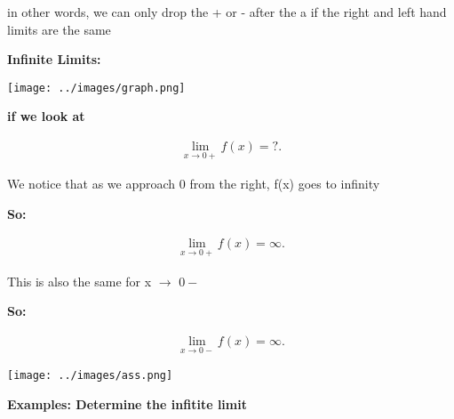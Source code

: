 \documentclass{report}
\begin{document}
    \bigbreak \noindent 
    in other words, we can only drop the + or - after the a if the right and left hand limits are the same

    \pagebreak
    \begin{large}
       \noindent \textbf{Infinite Limits:} 
    \end{large}
    
    \bigbreak \noindent \bigbreak 
    \begin{center}
        \texttt{[image: ../images/graph.png]}
    \end{center}
    
    \bigbreak \noindent 
    \textbf{if we look at }

    \begin{large}
        \begin{align*}
            \lim\limits_{x \to 0+}{f(x) = ?}
        .\end{align*}
    \end{large}
    
    \bigbreak \noindent 
    We notice that as we approach 0 from the right, f(x) goes to infinity

    \bigbreak \noindent 
    \textbf{So:}
    
    \begin{large}
        \begin{align*}
            \lim\limits_{x \to 0+}{f(x) = \infty}
        .\end{align*}
    \end{large}
    
    \bigbreak \noindent 
    This is also the same for x $\rightarrow$ $0-$
    
    \bigbreak \noindent 
    \textbf{So:}

    \begin{large}
        \begin{align*}
            \lim\limits_{x \to 0-}{f \left(x\right) = \infty}
        .\end{align*}
    \end{large}

    \bigbreak \noindent 

    \begin{center}
        \texttt{[image: ../images/ass.png]}
    \end{center}

    \bigbreak \noindent \bigbreak \noindent 
    \begin{large}
       \textbf{Examples: Determine the infitite limit} 
    \end{large}
\end{document}
